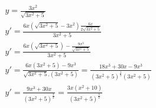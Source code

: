 \begin{ex}
\begin{align}
&y=\frac{3x^2}{\sqrt{3x^2+5}}\nonumber\\
&y'=\frac{6x(\sqrt{3x^2+5}-3x^2)\frac{6x}{2\sqrt{3x^2+5}}}{3x^2+5}\nonumber\\
&y'=\frac{6x(\sqrt{3x^2+5})-\frac{9x^3}{\sqrt{3x^2+5}}}{3x^2+5}\nonumber\\
&y'=\frac{6x(3x^2+5)-9x^3}{\sqrt{3x^2+5}.(3x^2+5)}=\frac{18x^3+30x-9x^3}{(3x^2+5)^\frac{1}{2}(3x^2+5)}\nonumber\\
&y'=\frac{9x^3+30x}{(3x^2+5)^\frac{3}{2}}=\frac{3x(x^2+10)}{(3x^2+5)^\frac{3}{2}}\nonumber
\end{align}
\end{ex}